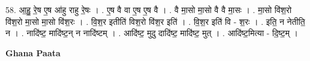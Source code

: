 \documentclass[17pt]{extarticle}
\begin{document}
58. आ॒हु॒ रे॒ष ए॒ष आ॑हु राहु रे॒षः । . ए॒ष वै वा ए॒ष ए॒ष वै । . वै मा॒सो मा॒सो वै वै मा॒सः । . मा॒सो वि॑श॒रो वि॑श॒रो मा॒सो मा॒सो वि॑श॒रः । . वि॒श॒र इतीति॑ विश॒रो वि॑श॒र इति॑ । . वि॒श॒र इति॑ वि - श॒रः । . इति॒ न नेतीति॒ न । . नादि॑ष्ट॒ मादि॑ष्ट॒न् न नादि॑ष्टम् । . आदि॑ष्ट॒ मुदु दादि॑ष्ट॒ मादि॑ष्ट॒ मुत् । . आदि॑ष्ट॒मित्या - दि॒ष्ट॒म् । \newline

\textbf{Ghana Paata } \newline
\end{document}
